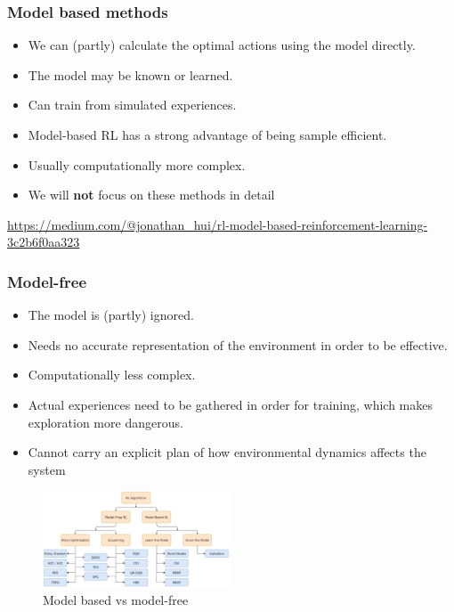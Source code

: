 \documentclass{article}
\begin{document}
\subsubsection{Model based methods}

\begin{itemize}
    \item We can (partly) calculate the optimal actions using the model directly.
    \item The model may be known or learned.
    \item Can train from simulated experiences.
    \item Model-based RL has a strong advantage of being sample efficient.
    \item Usually computationally more complex.
    \item We will \textbf{not} focus on these methods in detail
\end{itemize}

\url{https://medium.com/@jonathan_hui/rl-model-based-reinforcement-learning-3c2b6f0aa323}

\subsubsection{Model-free}

\begin{itemize}
    \item The model is (partly) ignored.
    \item Needs no accurate representation of the environment in order to be effective.
    \item Computationally less complex.
    \item Actual experiences need to be gathered in order for training, which makes exploration more dangerous.
    \item Cannot carry an explicit plan of how environmental dynamics affects the system
\end{itemize}

\begin{figure}[H]
    \centering
    \includegraphics[width=0.5\textwidth]{img/modelbased-vs-modelfree2.png}
    \caption{Model based vs model-free}
\end{figure}
\end{document}
